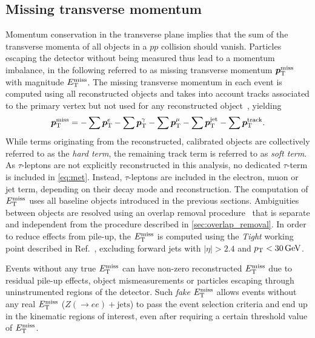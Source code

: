 \subsection{Missing transverse momentum}

Momentum conservation in the transverse plane implies that the sum of the transverse momenta of all objects in a $pp$ collision should vanish.
Particles escaping the detector without being measured thus lead to a momentum imbalance, in the following referred to as missing transverse momentum $\makemebold{p}^{\textrm{miss}}_\textrm{T}$ with magnitude $E_{\textrm{T}}^{\textrm{miss}}$.
The missing transverse momentum in each event is computed using all reconstructed objects and takes into account tracks associated to the primary vertex but not used for any reconstructed object~\cite{PERF-2016-07}, yielding
\begin{equation}
	\makemebold{p}^{\textrm{miss}}_\textrm{T} = - \sum\makemebold{p}^{e}_{\textrm{T}} - \sum\makemebold{p}^{\gamma}_{\textrm{T}} - \sum\makemebold{p}^{\mu}_{\textrm{T}} - \sum\makemebold{p}^{\mathrm{jet}}_{\textrm{T}} - \sum\makemebold{p}^{\mathrm{track}}_{\textrm{T}}.
	\label{eq:met}
\end{equation}
While terms originating from the reconstructed, calibrated objects are collectively referred to as the \textit{hard term}, the remaining track term is referred to as \textit{soft term}.
As $\tau$-leptons are not explicitly reconstructed in this analysis, no dedicated $\tau$-term is included in \cref{eq:met}. Instead, $\tau$-leptons are included in the electron, muon or jet term, depending on their decay mode and reconstruction. The computation of $E_{\textrm{T}}^{\textrm{miss}}$ uses all baseline objects introduced in the previous sections. Ambiguities between objects are resolved using an overlap removal procedure~\cite{PERF-2016-07} that is separate and independent from the procedure described in \cref{sec:overlap_removal}. In order to reduce effects from pile-up, the $E_{\textrm{T}}^{\textrm{miss}}$ is computed using the \textit{Tight} working point described in Ref.~\cite{ATLAS-CONF-2018-023}, excluding forward jets with $\vert\eta\vert > 2.4$ and $\pt < \SI{30}{\GeV}$.

Events without any true $E_{\textrm{T}}^{\textrm{miss}}$ can have non-zero reconstructed $E_{\textrm{T}}^{\textrm{miss}}$ due to residual pile-up effects, object mismeasurements or particles escaping through uninstrumented regions of the detector. Such \textit{fake} $E_{\textrm{T}}^{\textrm{miss}}$ allows events without any real $E_{\textrm{T}}^{\textrm{miss}}$ (\eg $Z(\rightarrow ee)+\mathrm{jets}$) to pass the event selection criteria and end up in the kinematic regions of interest, even after requiring a certain threshold value of $E_{\textrm{T}}^{\textrm{miss}}$.


